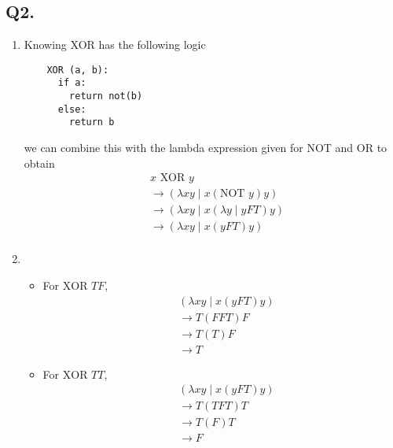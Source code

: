 \documentclass[8pt, letterpaper, titlepage]{article}
\begin{document}
\subsection*{Q2.}
\begin{enumerate}[label=(\alph*)]
  \item Knowing XOR has the following logic
  \begin{lstlisting}
    XOR (a, b):
      if a:
        return not(b)
      else:
        return b
  \end{lstlisting}
  we can combine this with the lambda expression given for NOT and OR to obtain
  \begin{align}
    &x \text{ XOR } y \\
    &\rightarrow (\lambda xy \mid x(\text{NOT } y) y)\\
    &\rightarrow (\lambda xy \mid x(\lambda y \mid y FT) y)\\
    &\rightarrow (\lambda xy \mid x(y FT) y)\\
  \end{align}
  \item \begin{itemize}
    \item For $\text{XOR } TF$,
    \begin{align}
      &(\lambda xy \mid x(y FT) y)\\
      &\rightarrow T(F FT) F \\
      &\rightarrow T(T)F \\
      &\rightarrow T
    \end{align}
    \item For $\text{XOR } TT$,
    \begin{align}
      &(\lambda xy \mid x(y FT) y)\\
      &\rightarrow T(T FT) T \\
      &\rightarrow T(F)T \\
      &\rightarrow F
    \end{align}
  \end{itemize}
\end{enumerate}
\end{document}
